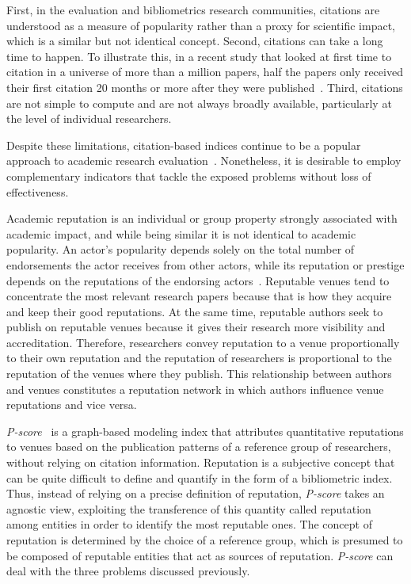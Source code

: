 \documentclass[notitlepage]{svjour3}
\begin{document}
First, in the evaluation and bibliometrics research communities, citations are understood
as a measure of popularity rather than a proxy for scientific impact, which is a similar but not
identical concept.
Second, citations can take a long time to happen. To illustrate this, in a recent
study that looked at first time to citation in a universe of more than a million papers, half the 
papers only received their first citation 20 months or more after they were
published~\cite{Nane2012}. Third, citations are not simple to compute and are not always broadly
available, particularly at the level of individual researchers.

Despite these limitations, citation-based indices continue to be a popular approach to
academic research evaluation~\cite{Kellner2008}.
Nonetheless, it is desirable to employ
complementary indicators that tackle the exposed problems without loss of effectiveness.

Academic reputation is an individual or group property strongly associated with 
academic impact, and while being similar it is not identical to academic popularity. An 
actor's popularity depends solely on the total number of endorsements
the actor receives from other actors, while its reputation or prestige depends on the 
reputations of the endorsing actors~\cite{Bollen2006}. Reputable venues tend to 
concentrate the most relevant research papers 
because that is how they acquire and keep their good reputations. At the same time, 
reputable authors seek to publish on reputable venues because it gives their 
research more visibility and accreditation. Therefore, researchers convey reputation
to a venue proportionally to their own reputation and the reputation of researchers
is proportional to the reputation of the venues where they publish.
This relationship between authors and venues constitutes a reputation network in which 
authors influence venue reputations and vice versa. 

{\em P-score}~\cite{Ribas2015a} is a graph-based modeling index that attributes quantitative
reputations to venues based on the publication patterns of a reference group of researchers,
without relying on citation information. Reputation is a subjective concept that can be 
quite difficult to define and quantify in the form of a bibliometric index. Thus,
instead of relying on a precise definition of reputation, {\em P-score} takes an agnostic 
view, exploiting the transference of this quantity called reputation among entities in order 
to identify the most reputable ones. The concept of reputation is determined by the choice of 
a reference group, which is presumed to be composed of reputable entities that act as sources
of reputation. {\em P-score} can deal with the three problems discussed previously. 
\end{document}
